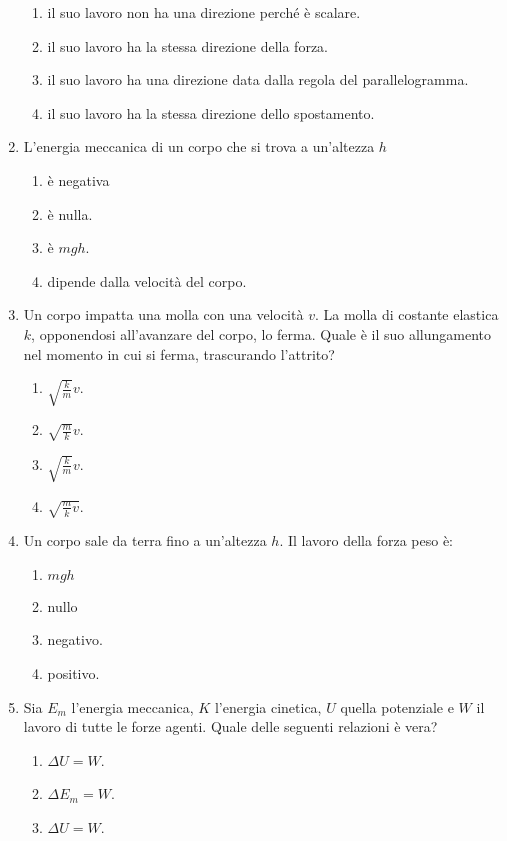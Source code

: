 \documentclass{article}
\begin{document}
\begin{enumerate}
\begin{enumerate}[label=\Alph*.]
    \item il suo lavoro non ha una direzione perché è scalare.
    \item il suo lavoro ha la stessa direzione della forza.
    \item il suo lavoro ha una direzione data dalla regola del parallelogramma.
    \item il suo lavoro ha la stessa direzione dello spostamento.
  \end{enumerate}
  \item L'energia meccanica di un corpo che si trova a un'altezza $h$
  \begin{enumerate}[label=\Alph*.]
    \item è negativa
    \item è nulla.
    \item è $mgh$.
    \item dipende dalla velocità del corpo.
  \end{enumerate}
  \item Un corpo impatta una molla con una velocità $v$. La molla di costante elastica $k$, opponendosi all'avanzare del corpo, lo ferma. Quale è il suo allungamento nel momento in cui si ferma, trascurando l'attrito?
  \begin{enumerate}[label=\Alph*.]
    \item $\sqrt{\frac{k}{m}}v$.
    \item $\sqrt{\frac{m}{k}}v$.
    \item $\sqrt{\frac{k}{m}}v$.
    \item $\sqrt{\frac{m}{k}v}$.
  \end{enumerate}
  \item Un corpo sale da terra fino a un'altezza $h$. Il lavoro della forza peso è:
  \begin{enumerate}[label=\Alph*.]
    \item $mgh$
    \item nullo
    \item negativo.
    \item positivo.
  \end{enumerate}
  \item Sia $E_m$ l'energia meccanica, $K$ l'energia cinetica, $U$ quella potenziale e $W$ il lavoro di tutte le forze agenti. Quale delle seguenti relazioni è vera?
  \begin{enumerate}[label=\Alph*.]
    \item $\Delta U=W$.
    \item $\Delta E_m=W$.
    \item $\Delta U=W$.

\end{enumerate}
\end{enumerate}
\end{document}
